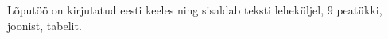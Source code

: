 Lõputöö on kirjutatud eesti keeles ning sisaldab teksti  leheküljel, 9 peatükki,  joonist,  tabelit.

